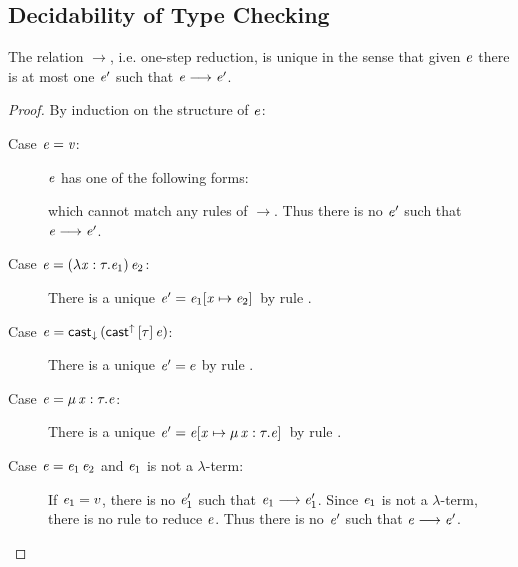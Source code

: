 \subsection{Decidability of Type Checking}
\begin{lem}\label{lem:appendix:unired}
	The relation $ \longrightarrow $, i.e. one-step reduction, is unique in the sense that given $\mathit{e}$ there is at most one $\mathit{e'}$ such that $\mathit{e}  \longrightarrow  \mathit{e'}$.
\end{lem}

\begin{proof}
	By induction on the structure of $\mathit{e}$:
	\begin{description}
		\item[Case $\mathit{e}  =  \mathit{v}$:] $\mathit{e}$ has one of the following forms:
		\begin{inparaenum}[(1)]
		    \item $\star$,
			\item $\lambda  \ottmv{x}  \ottsym{:}  \tau  \ottsym{.}  \ottnt{e}$,
			\item $\Pi \, \ottmv{x}  \ottsym{:}  \tau_{{\mathrm{1}}}  \ottsym{.}  \tau_{{\mathrm{2}}}$,
			\item $\kw{cast}^{\uparrow} \, \ottsym{[}  \tau  \ottsym{]} \,  \ottnt{e}$,
		\end{inparaenum}
		which cannot match any rules of $ \longrightarrow $. Thus there is no $\mathit{e}'$ such that $\mathit{e}  \longrightarrow  \mathit{e'}$.
		\item[Case $\mathit{e}=(  \lambda  \mathit{x}  :  \tau  .  \mathit{e_{{\mathrm{1}}}}  ) \, \mathit{e_{{\mathrm{2}}}}$:] There is a unique $\mathit{e}'=\mathit{e_{{\mathrm{1}}}}  [  \mathit{x}  \mapsto  \mathit{e_{{\mathrm{2}}}}  ] \,$ by rule .
		\item[Case $\mathit{e}=\mathsf{cast}_{\downarrow} \, (  \mathsf{cast}^{\uparrow} \, [  \tau  ] \,  \mathit{e}  )$:] There is a unique $\mathit{e}'=e$ by rule .
		\item[Case $\mathit{e}=\mu \, \mathit{x}  :  \tau  .  \mathit{e}$:] There is a unique $\mathit{e}'=\mathit{e}  [  \mathit{x}  \mapsto  \mu \, \mathit{x}  :  \tau  .  \mathit{e}  ] \,$ by rule .
		\item[Case $\mathit{e}=\mathit{e_{{\mathrm{1}}}} \, \mathit{e_{{\mathrm{2}}}}$ and $\mathit{e_{{\mathrm{1}}}}$ is not a $\lambda$-term:] If $\mathit{e_{{\mathrm{1}}}}=v$, there is no $\mathit{e'_{{\mathrm{1}}}}$ such that $\mathit{e_{{\mathrm{1}}}}  \longrightarrow  \mathit{e'_{{\mathrm{1}}}}$. Since $\mathit{e_{{\mathrm{1}}}}$ is not a $\lambda$-term, there is no rule to reduce $\mathit{e}$. Thus there is no $\mathit{e}'$ such that $\mathit{e}  \longrightarrow  \mathit{e'}$.
		

\end{description}
\end{proof}
